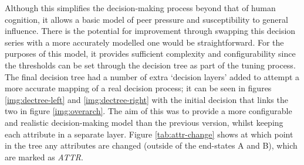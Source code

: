 \documentclass[]{report}
\begin{document}
Although this simplifies the decision-making process beyond that of human cognition, it allows a basic model of peer pressure and susceptibility to general influence. There is the potential for improvement through swapping this decision series with a more accurately modelled one would be straightforward. For the purposes of this model, it provides sufficient complexity and configurability since the thresholds can be set through the decision tree as part of the tuning process.
The final decision tree had a number of extra `decision layers' added to attempt a more accurate mapping of a real decision process; it can be seen in figures \ref{img:dectree-left} and \ref{img:dectree-right} with the initial decision that links the two in figure \ref{img:overarch}. The aim of this was to provide a more configurable and realistic decision-making model than the previous version, whilst keeping each attribute in a separate layer. Figure \ref{tab:attr-change} shows at which point in the tree any attributes are changed (outside of the end-states A and B), which are marked as \emph{ATTR}.
\end{document}
